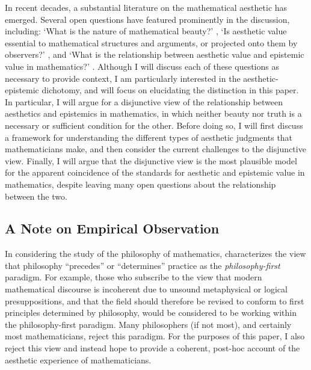 \documentclass[a4paper,man,natbib]{apa6}
\begin{document}
In recent decades, a substantial literature on the mathematical aesthetic has emerged. Several open questions have
featured prominently in the discussion, including: `What is the nature of mathematical beauty?' 
\citep{blasjo_definition_2012,cellucci_mathematical_2015}, `Is aesthetic value essential to mathematical structures
and arguments, or projected onto them by observers?' \citep{mcallister_mathematical_2005}, and `What is the relationship
between aesthetic value and epistemic value in mathematics?' \citep{todd_unmasking_2008,todd_fitting_2018}. Although
I will discuss each of these questions as necessary to provide context, I am particularly interested in the 
aesthetic-epistemic dichotomy, and will focus on elucidating the distinction in this paper. In particular, I will argue for a
disjunctive view of the relationship between aesthetics and epistemics in mathematics, in which neither beauty
nor truth is a necessary or sufficient condition for the other. Before doing so, I will first discuss a framework
for understanding the different types of aesthetic judgments that mathematicians make, and then consider the current
challenges to the disjunctive view. Finally, I will argue that the disjunctive view is the most plausible model
for the apparent coincidence of the standards for aesthetic and epistemic value in mathematics, despite leaving
many open questions about the relationship between the two.

\subsection{A Note on Empirical Observation}

In considering the study of the philosophy of mathematics, \cite{shapiro_thinking_2000} characterizes
the view that philosophy ``precedes'' or ``determines'' practice as the \textit{philosophy-first} paradigm.
For example, those who subscribe to the view that modern mathematical discourse is incoherent due to unsound
metaphysical or logical presuppositions, and that the field should therefore be revised to conform to
first principles determined by philosophy, would be considered to be working within the philosophy-first
paradigm. Many philosophers (if not most), and certainly most mathematicians, reject this paradigm. For the
purposes of this paper, I also reject this view and instead hope to provide a coherent, post-hoc account
of the aesthetic experience of mathematicians. 
\end{document}
